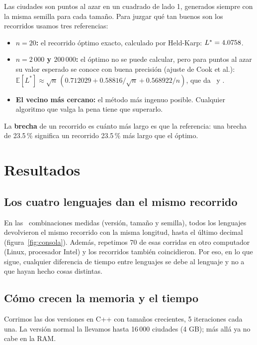 \documentclass[11pt,a4paper]{article}
\begin{document}
Las ciudades son puntos al azar en un cuadrado de lado 1, generados siempre con la
misma semilla para cada tamaño. Para juzgar qué tan buenos son los recorridos usamos
tres referencias:
\begin{itemize}[itemsep=1pt]
\item \textbf{$n=20$:} el recorrido óptimo exacto, calculado por Held-Karp:
  $L^\ast=4.0758$.
\item \textbf{$n=2\,000$ y $200\,000$:} el óptimo no se puede calcular, pero para puntos al
  azar su valor esperado se conoce con buena precisión (ajuste de Cook et al.):
  $\mathbb{E}[L^\ast]\approx\sqrt{n}\,(0.712029+0.58816/\sqrt n+0.568922/n)$, que da
  \BhhDosMil\ y \BhhDoscientosMil.
\item \textbf{El vecino más cercano:} el método más ingenuo posible. Cualquier algoritmo
  que valga la pena tiene que superarlo.
\end{itemize}
La \textbf{brecha} de un recorrido es cuánto más largo es que la referencia: una brecha
de 23.5\,\% significa un recorrido 23.5\,\% más largo que el óptimo.

\section{Resultados}

\subsection{Los cuatro lenguajes dan el mismo recorrido}

En las \ToursIdenticos\ combinaciones medidas (versión, tamaño y semilla), todos los
lenguajes devolvieron el mismo recorrido con la misma longitud, hasta el último
decimal (figura~\ref{fig:consola}). Además, repetimos 70 de esas corridas en otro
computador (Linux, procesador Intel) y los recorridos también coincidieron. Por eso,
en lo que sigue, cualquier diferencia de tiempo entre lenguajes se debe al lenguaje y
no a que hayan hecho cosas distintas.

\subsection{Cómo crecen la memoria y el tiempo}
\label{sec:escalamiento}

Corrimos las dos versiones en C++ con tamaños crecientes, 5 iteraciones cada una. La
versión normal la llevamos hasta 16\,000 ciudades (4 GB); más allá ya no cabe en la
RAM.
\end{document}
